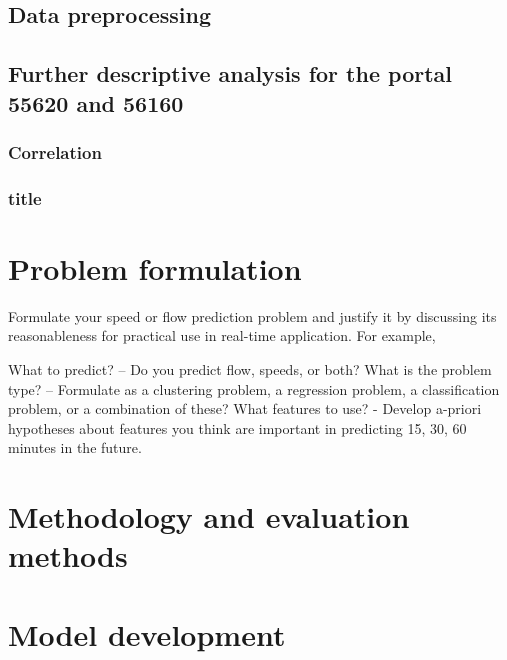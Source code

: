 	
	
	\subsection{Data preprocessing}
	\subsection{Further descriptive analysis for the portal 55620 and 56160}
	\subsubsection{Correlation}
	\subsubsection{title}
	\section{Problem formulation}
	
	Formulate your speed or flow prediction problem and justify it by discussing its reasonableness for practical use in real-time application. For example,   
	
	What to predict? – Do you predict flow, speeds, or both?
	What is the problem type? – Formulate as a clustering problem, a regression problem, a classification problem, or a combination of these? 
	What features to use? - Develop a-priori hypotheses about features you think are important in predicting 15, 30, 60 minutes in the future. 
	
	\section{Methodology and evaluation methods}
	
	
	\section{Model development}
	
